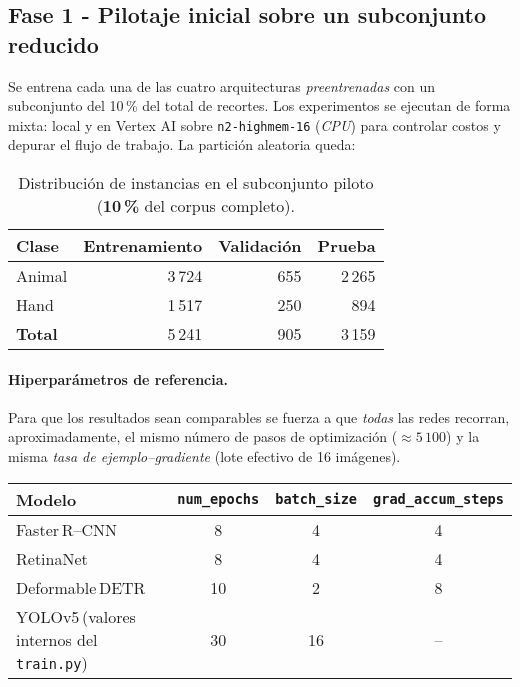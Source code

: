 \subsection*{Fase 1 - Pilotaje inicial sobre un subconjunto reducido}

Se entrena cada una de las cuatro arquitecturas \emph{preentrenadas} con un subconjunto del 10\,\% del total de recortes.
Los experimentos se ejecutan de forma mixta: local y en Vertex AI sobre \texttt{n2-highmem-16} (\emph{CPU}) para controlar costos y depurar el flujo de trabajo.
La partición aleatoria queda:

\begin{table}[!h]
    \centering
    \begin{tabular}{l r r r}
        \hline
        \textbf{Clase} & \textbf{Entrenamiento} & \textbf{Validación} & \textbf{Prueba} \\
        \hline
        Animal & 3\,724 & 655 & 2\,265 \\
        Hand   & 1\,517 & 250 &   894 \\
        \hline
        \textbf{Total} & 5\,241 & 905 & 3\,159 \\
    \end{tabular}
    \caption{Distribución de instancias en el subconjunto piloto (\textbf{10\,\%} del corpus completo).}
    \label{tab:pilot_split}
\end{table}

\paragraph{Hiperparámetros de referencia.}
Para que los resultados sean comparables se fuerza a que \emph{todas} las redes recorran, aproximadamente, el mismo número de pasos de optimización (\(\approx 5\,100\)) y la misma \emph{tasa de ejemplo–gradiente} (lote efectivo de 16 imágenes).

\begin{center}
\begin{tabular}{lccc}
\hline
\textbf{Modelo} & \texttt{num\_epochs} & \texttt{batch\_size} & \texttt{grad\_accum\_steps} \\
\hline
Faster\,R--CNN   & 8  & 4  & 4  \\
RetinaNet        & 8  & 4  & 4  \\
Deformable\,DETR & 10 & 2  & 8  \\
YOLOv5\,(valores internos del \texttt{train.py}) & 30 & 16 & -- \\
\hline
\end{tabular}
\end{center}

